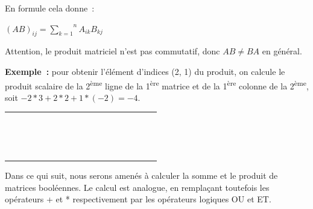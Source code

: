 			En formule cela donne~:
			
			\begin{center}
			$(AB)_{ij} = \overset n{\underset{k=1}\sum} A_{ik} B_{kj}$
			\end{center}
			
			Attention, le produit matriciel n'est pas commutatif, 
			donc $AB \neq BA$ en général.

			\textbf{Exemple~:} pour obtenir l'élément d'indices (2, 1) 
			du produit, on calcule le produit scalaire de la
			2\textsuperscript{ème} ligne de la 1\textsuperscript{ère} 
			matrice et de la 1\textsuperscript{ère} colonne de la
			2\textsuperscript{ème}, soit $-2*3 + 2*2 + 1*(-2) = -4$.

			\begin{center}
				\tablefirsthead{}
				\tablehead{}
				\tabletail{}
				\tablelasttail{}
				\begin{supertabular}{|m{0.601cm}|m{0.601cm}|m{0.601cm}|m{0.601cm}m{0.601cm}m{0.601cm}|m{0.601cm}|m{0.601cm}|m{0.601cm}|m{0.601cm}m{0.601cm}m{0.601cm}|m{0.601cm}|m{0.601cm}|m{0.61800003cm}|}
				\hhline{---~~~---~~~---}
				 &
				 &
				 &
				~
				 &
				~
				 &
				~
				 &
				 &
				 &
				 &
				~
				 &
				~
				 &
				~
				 &
				 &
				 &
				\centering{}\\\hhline{---~~~---~~~---}
				 &
				 &
				 &
				~
				 &
				\centering{ *} &
				~
				 &
				 &
				 &
				 &
				~
				 &
				\centering{ =} &
				~
				 &
				 &
				 &
				\centering{}\\\hhline{---~~~---~~~---}
				 &
				 &
				 &
				~
				 &
				~
				 &
				~
				 &
				 &
				 &
				 &
				~
				 &
				~
				 &
				~
				 &
				 &
				 &
				\centering{}\\\hhline{---~~~---~~~---}
				\end{supertabular}
			\end{center}

			Dans ce qui suit, nous serons amenés à calculer la somme 
			et le produit de matrices booléennes. Le calcul est analogue,
			en remplaçant toutefois les opérateurs + et * respectivement 
			par les opérateurs logiques OU et ET.

